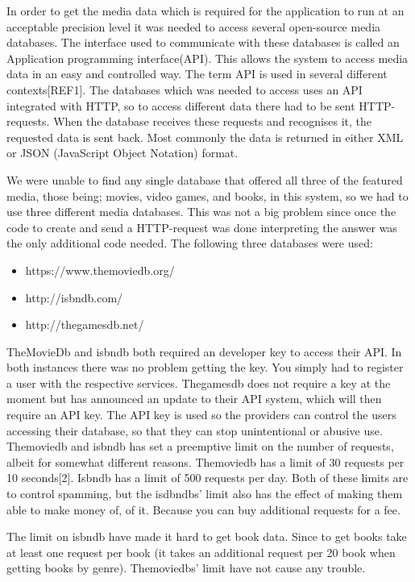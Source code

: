 In order to get the media data which is required for the application to run at an acceptable precision level it was needed to access several open-source media databases. The interface used to communicate with these databases is called an Application programming interface(API). This allows the system to access media data in an easy and controlled way. The term API is used in several different contexts[REF1]. The databases which was  needed to access uses an API integrated with HTTP, so to access different data there had to be sent HTTP-requests. When the database receives these requests and recognises it, the requested data is sent back. Most commonly the data is returned in either XML or JSON (JavaScript Object Notation) format.

We were unable to find any single database that offered all three of the featured media, those being; movies, video games, and books, in this system, so we had to use three different media databases. This was not a big problem since once the code to create and send a HTTP-request was done interpreting the answer was the only additional code needed.  The following three databases were used:

\begin{itemize}
	\item https://www.themoviedb.org/
	\item http://isbndb.com/
	\item http://thegamesdb.net/
\end{itemize}

TheMovieDb and isbndb both required an developer key to access their API. In both instances there was no problem getting the key. You simply had to register a user with the respective services. %
Thegamesdb does not require a key at the moment but has announced an update to their API system, which will then require an API key.
The API key is used so the providers can control the users accessing their database, so that  they can stop unintentional or abusive use. Themoviedb and isbndb has set a preemptive limit on the number of requests, albeit for somewhat different reasons. Themoviedb has a limit of 30 requests per 10 seconds[2]. Isbndb has a limit of 500 requests per day. Both of these limits are to control spamming, but the isdbndbs’ limit also has the effect of making them able to make money of, of it. Because you can buy additional requests for a fee.

The limit on isbndb have made it hard to get book data. Since to get books take at least one request per book (it takes an additional request per 20 book when getting books by genre). Themoviedbs’ limit have not cause any trouble.

